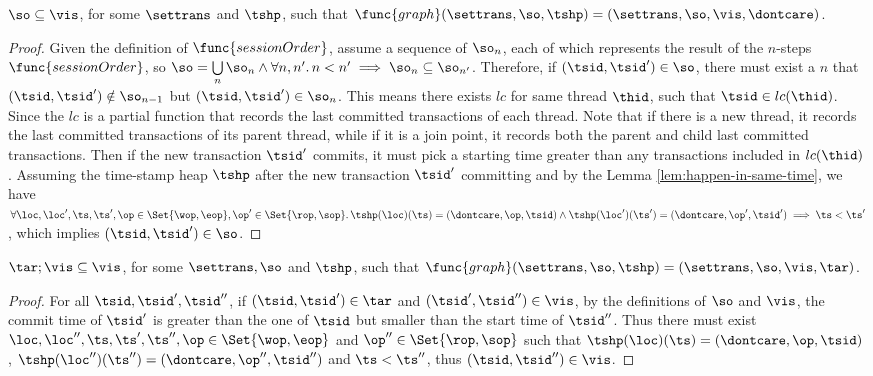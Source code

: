 \begin{lem}[Session]
    \( \so \subseteq \vis \), for some \( \settrans \) and \( \tshp\), such that \( \func{graph}(\settrans,\so,\tshp) = (\settrans,\so,\vis,\dontcare ) \).
\end{lem}   
\begin{proof}
    Given the definition of \( \func{sessionOrder} \), assume a sequence of \( \so_n \), each of which represents the result of the \( n \)-steps \(\func{sessionOrder} \), so \( \so = \bigcup\limits_{n} \so_n \land \forall n, n' \ldotp n < n' \implies \so_n \subseteq \so_{n'} \).
    Therefore, if \( ( \tsid , \tsid' ) \in \so \), there must exist a \( n \) that \( ( \tsid , \tsid' ) \notin \so_{n-1} \) but \( ( \tsid , \tsid' ) \in \so_{n} \).
    This means there exists \( lc \) for same thread \( \thid \), such that \( \tsid \in lc(\thid) \).
    Since the \( lc \) is a partial function that records the last committed transactions of each thread.
    Note that if there is a new thread, it records the last committed transactions of its parent thread, while if it is a join point, it records both the parent and child last committed transactions.
    Then if the new transaction \( \tsid' \) commits, it must pick a starting time greater than any transactions included in \( lc(\thid) \).
    Assuming the time-stamp heap \( \tshp \) after the new transaction \( \tsid' \) committing and by the Lemma \ref{lem:happen-in-same-time}, we have \( \forall \loc, \loc', \ts, \ts', \op \in \Set{\wop,\eop}, \op' \in \Set{\rop,\sop} \ldotp \tshp(\loc)(\ts) = (\dontcare, \op, \tsid) \land \tshp(\loc')(\ts') = (\dontcare, \op', \tsid') \implies \ts < \ts' \), which implies \( (\tsid, \tsid') \in \so \).
\end{proof}

\begin{lem}[prefix]
    \label{lem:prefix}
    \( \tar; \vis \subseteq \vis \), for some \( \settrans, \so \) and \( \tshp\), such that \( \func{graph}(\settrans,\so,\tshp) = (\settrans,\so,\vis,\tar ) \).
\end{lem}
\begin{proof}
    For all \( \tsid, \tsid', \tsid'' \), if \( (\tsid, \tsid') \in \tar \) and \( (\tsid', \tsid'') \in \vis \), by the definitions of \( \so \) and \( \vis \), the commit time of \( \tsid' \) is greater than the one of \( \tsid \) but smaller than the start time of \( \tsid'' \).
    Thus there must exist \( \loc, \loc'', \ts, \ts' , \ts'', \op \in \Set{\wop, \eop}  \) and \( \op'' \in \Set{\rop, \sop } \) such that  \( \tshp(\loc)(\ts) = (\dontcare, \op, \tsid) \), \( \tshp(\loc'')(\ts'') = (\dontcare, \op'', \tsid'') \) and \( \ts < \ts'' \), thus \( ( \tsid, \tsid'' ) \in \vis \).
\end{proof}

